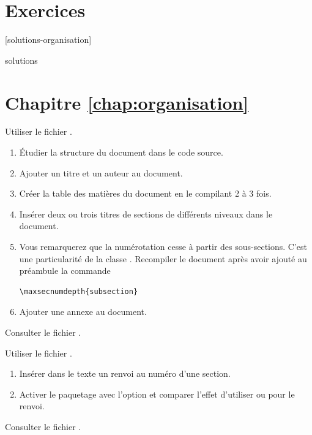 
\section{Exercices}
\label{sec:organisation:exercices}

[solutions-organisation]

\begin{Filesave}{solutions}
\section*{Chapitre \ref*{chap:organisation}}

\end{Filesave}

\begin{exercice}
  Utiliser le fichier .
  \begin{enumerate}
  \item Étudier la structure du document dans le code source.
  \item Ajouter un titre et un auteur au document.
  \item Créer la table des matières du document en le compilant 2 à 3
    fois.
  \item Insérer deux ou trois titres de sections de différents niveaux
    dans le document.
  \item Vous remarquerez que la numérotation cesse à partir des
    sous-sections. C'est une particularité de la classe
    . Recompiler le document après avoir ajouté au
    préambule la commande
\begin{lstlisting}
\maxsecnumdepth{subsection}
\end{lstlisting}
  \item Ajouter une annexe au document.
  \end{enumerate}
  \begin{sol}
    Consulter le fichier .
  \end{sol}
\end{exercice}

\begin{exercice}
  Utiliser le fichier .
  \begin{enumerate}
  \item Insérer dans le texte un renvoi au numéro d'une section.
  \item Activer le paquetage  avec l'option
     et comparer l'effet d'utiliser \cmd{\ref} ou
    \cmd{\autoref} pour le renvoi.
  \end{enumerate}
  \begin{sol}
    Consulter le fichier .
  \end{sol}
\end{exercice}

